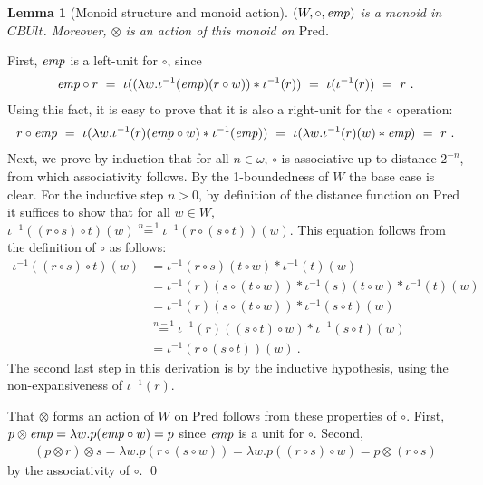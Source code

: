 \documentclass{LMCS}
\newtheorem{lemma}[theorem]{Lemma}
\theoremstyle{remark}
\newcommand{\EMP}{\ensuremath{\textit{emp}}}
\newcommand{\wemp}{\textnormal{\textit{emp}}}
\newcommand{\Pred}{\ensuremath{\mathrm{Pred}}\xspace}
\newcommand{\CBUlt}{\mathit{CBUlt}\xspace}
\newcommand{\W}{\ensuremath{W}}
\newcommand{\FOLD}{\ensuremath{\iota}}
\newcommand{\UNFOLD}{\ensuremath{\iota^{-1}}}
\newcommand{\nequiv}[1]{\ensuremath{\mathrel{\stackrel{#1}{=}}}}
\begin{document}
\begin{lemma}
[Monoid structure and monoid action]
\label{lem:monoid-structure}
  $(W,\circ,\wemp)$ is a monoid in $\CBUlt$. Moreover, $\otimes$ is an action of 
  this monoid on $\Pred$.
\end{lemma}
\proof
First, $\wemp$ is a left-unit for $\circ$, since 
\begin{align*}
\wemp\circ r 
\ =\ \FOLD((\lambda w.\UNFOLD(\wemp)(r\circ w)) * \UNFOLD (r))
\ =\ \FOLD(\UNFOLD(r)) 
\ =\ r\ .
\end{align*} 
Using this fact, it is easy to prove that it is also a right-unit for the $\circ$ operation: 
\begin{align*}
r\circ\wemp 
\ =\ \FOLD(\lambda w.\UNFOLD(r)(\wemp\circ w) * \UNFOLD(\wemp))
\ =\ \FOLD(\lambda w.\UNFOLD(r)(w) * \EMP)
\ =\ r\ .
\end{align*}
Next, we prove by induction that for all $n\in\omega$, $\circ$ is associative up to distance $2^{-n}$, from which associativity follows. By the 1-boundedness of $W$ the base case is clear. For the inductive step $n>0$,  by definition of the distance function on $\Pred$ it suffices to show that for all $w\in\W$, $\UNFOLD((r\circ s)\circ t)(w) \nequiv {n-1} \UNFOLD(r\circ (s\circ t))(w)$. This equation follows from the definition of $\circ$ as follows:
\begin{align*}
\UNFOLD((r\circ s)\circ t)(w)
&= \UNFOLD(r\circ s)(t\circ w) * \UNFOLD(t)(w)\\
&= \UNFOLD(r)(s\circ(t\circ w)) * \UNFOLD(s)(t\circ w) * \UNFOLD(t)(w)\\
&=  \UNFOLD(r)(s\circ(t\circ w)) * \UNFOLD(s\circ t)(w)\\
&\nequiv{n-1}   \UNFOLD(r)((s\circ t)\circ w) * \UNFOLD(s\circ t)(w)\\
&= \UNFOLD(r\circ(s\circ t))(w)\ .
\end{align*}
The second last step in this derivation is by the inductive hypothesis, using the non-expansiveness of $\UNFOLD(r)$. 

That $\otimes$ forms an action of $\W$ on $\Pred$ follows from these properties of $\circ$. First, $p\otimes\wemp = \lambda w.p(\wemp\circ w) = p$ since $\wemp$ is a unit for $\circ$. Second,
\begin{align*}
(p\otimes r)\otimes s 
= \lambda w.p(r\circ(s\circ w))
=\lambda w.p((r\circ s)\circ w) 
= p\otimes(r\circ s)
\end{align*}
by the associativity of $\circ$. \qed
\end{document}
